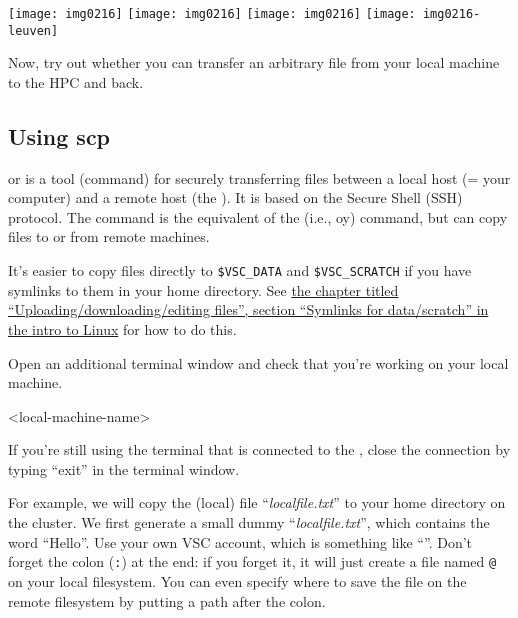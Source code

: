   \firsttimeconnection

  \begin{center}
\ifantwerpen
  \texttt{[image: img0216]}
\fi
\ifbrussel
  \texttt{[image: img0216]}
\fi
\ifgent
  \texttt{[image: img0216]}
\fi
\ifleuven
  \texttt{[image: img0216-leuven]}
\fi
  \end{center}

  Now, try out whether you can transfer an arbitrary file from your local
  machine to the HPC and back.

\fi

\ifmacORlinux
  \subsection{Using scp}

   or  is a tool (command) for securely
  transferring files between a local host (= your computer) and a remote host
  (the \hpc). It is based on the Secure Shell (SSH) protocol.  The 
  command is the equivalent of the   (i.e., oy)
  command, but can copy files to or from remote machines.

  It's easier to copy files directly to \lstinline|$VSC_DATA| and \lstinline|$VSC_SCRATCH|
  if you have symlinks to them in your home directory. See
  \href{\LinuxManualURL#sec:symlink-for-data}{the chapter titled ``Uploading/downloading/editing files'', section ``Symlinks for data/scratch'' in the intro to Linux}
  for how to do this.


  Open an additional terminal window and check that you're working on your local
  machine.

\begin{prompt}
<local-machine-name>
\end{prompt}

  If you're still using the terminal that is connected to the \hpc, close the
  connection by typing ``exit'' in the terminal window.

  For example, we will copy the (local) file ``\emph{localfile.txt}'' to your
  home directory on the \hpc cluster. We first generate a small dummy
  ``\emph{localfile.txt}'', which contains the word ``Hello''.  Use your own
  VSC account, which is something like ``\emph{\userid}''. Don't
  forget the colon (\lstinline|:|) at the end: if you forget it, it will just create a file
  named \texttt{\userid{}@\loginnode{}} on your local filesystem. You can even
  specify where to save the file on the remote filesystem by putting a path after the colon.


